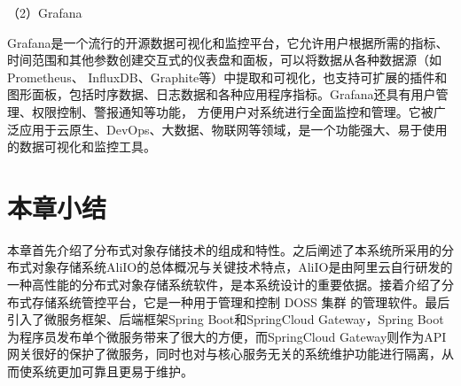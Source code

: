 （2）Grafana

Grafana是一个流行的开源数据可视化和监控平台，它允许用户根据所需的指标、时间范围和其他参数创建交互式的仪表盘和面板\cite{koing2keji}，可以将数据从各种数据源（如Prometheus、
InfluxDB、Graphite等）中提取和可视化，也支持可扩展的插件和图形面板，包括时序数据、日志数据和各种应用程序指标。Grafana还具有用户管理、权限控制、警报通知等功能，
方便用户对系统进行全面监控和管理\cite{koi56keji}。它被广泛应用于云原生、DevOps、大数据、物联网等领域，是一个功能强大、易于使用的数据可视化和监控工具。

\section{本章小结}

本章首先介绍了分布式对象存储技术的组成和特性。之后阐述了本系统所采用的分布式对象存储系统AliIO的总体概况与关键技术特点，AliIO是由阿里云自行研发的一种高性能的分布式对象存储系统软件，是本系统设计的重要依据。接着介绍了分布式存储系统管控平台，它是一种用于管理和控制 DOSS 集群
的管理软件。最后引入了微服务框架、后端框架Spring Boot和SpringCloud Gateway，Spring Boot为程序员发布单个微服务带来了很大的方便，而SpringCloud Gateway则作为API网关很好的保护了微服务，同时也对与核心服务无关的系统维护功能进行隔离，从而使系统更加可靠且更易于维护。

